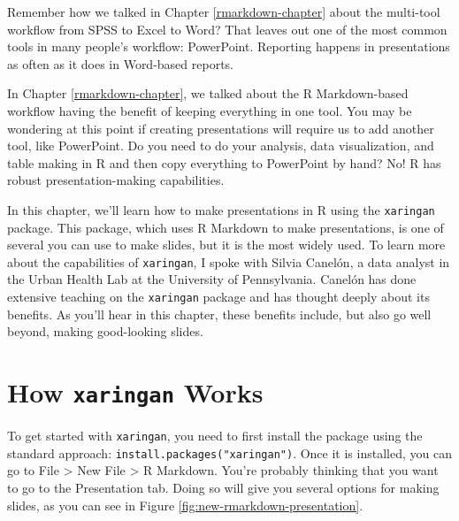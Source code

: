 \documentclass[
]{book}
\begin{document}
Remember how we talked in Chapter \ref{rmarkdown-chapter} about the multi-tool workflow from SPSS to Excel to Word? That leaves out one of the most common tools in many people's workflow: PowerPoint. Reporting happens in presentations as often as it does in Word-based reports.

In Chapter \ref{rmarkdown-chapter}, we talked about the R Markdown-based workflow having the benefit of keeping everything in one tool. You may be wondering at this point if creating presentations will require us to add another tool, like PowerPoint. Do you need to do your analysis, data visualization, and table making in R and then copy everything to PowerPoint by hand? No! R has robust presentation-making capabilities.

In this chapter, we'll learn how to make presentations in R using the \texttt{xaringan} package. This package, which uses R Markdown to make presentations, is one of several you can use to make slides, but it is the most widely used. To learn more about the capabilities of \texttt{xaringan}, I spoke with Silvia Canelón, a data analyst in the Urban Health Lab at the University of Pennsylvania. Canelón has done extensive teaching on the \texttt{xaringan} package and has thought deeply about its benefits. As you'll hear in this chapter, these benefits include, but also go well beyond, making good-looking slides.

\hypertarget{how-xaringan-works}{%
\section*{\texorpdfstring{How \texttt{xaringan} Works}{How xaringan Works}}\label{how-xaringan-works}}

To get started with \texttt{xaringan}, you need to first install the package using the standard approach: \texttt{install.packages("xaringan")}. Once it is installed, you can go to File \textgreater{} New File \textgreater{} R Markdown. You're probably thinking that you want to go to the Presentation tab. Doing so will give you several options for making slides, as you can see in Figure \ref{fig:new-rmarkdown-presentation}.
\end{document}

